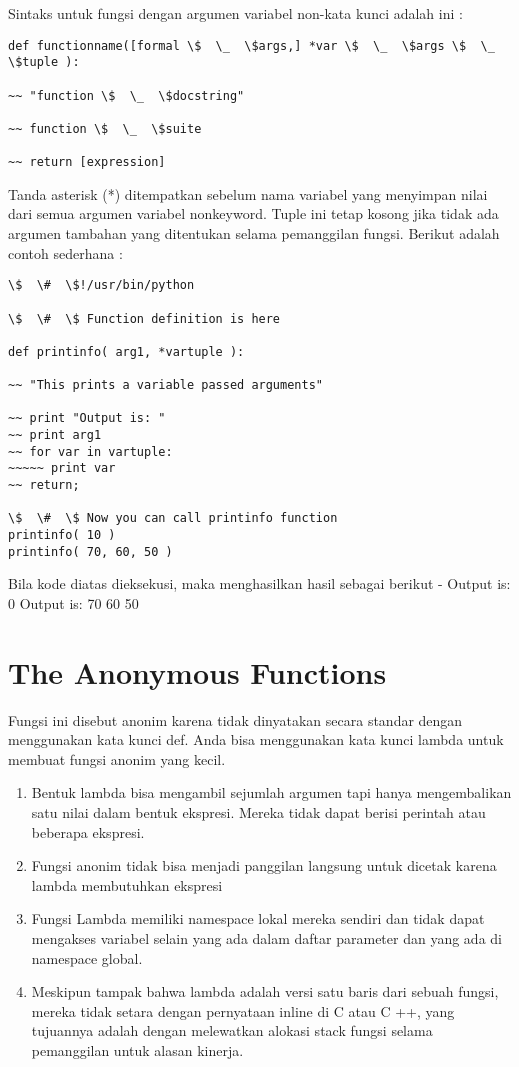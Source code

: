 Sintaks untuk fungsi dengan argumen variabel non-kata kunci adalah ini :
\begin{verbatim}
def functionname([formal \$  \_  \$args,] *var \$  \_  \$args \$  \_  \$tuple ): 

~~ "function \$  \_  \$docstring" 

~~ function \$  \_  \$suite 

~~ return [expression]
\end{verbatim}
Tanda asterisk (*) ditempatkan sebelum nama variabel yang menyimpan nilai dari semua argumen variabel nonkeyword. Tuple ini tetap kosong jika tidak ada argumen tambahan yang ditentukan selama pemanggilan fungsi. Berikut adalah contoh sederhana : 
\begin{verbatim}
\$  \#  \$!/usr/bin/python 

\$  \#  \$ Function definition is here 

def printinfo( arg1, *vartuple ): 

~~ "This prints a variable passed arguments" 

~~ print "Output is: " 
~~ print arg1
~~ for var in vartuple:
~~~~~ print var 
~~ return; 

\$  \#  \$ Now you can call printinfo function
printinfo( 10 ) 
printinfo( 70, 60, 50 ) 
\end{verbatim}
Bila kode diatas dieksekusi, maka menghasilkan hasil sebagai berikut - 
Output is: 
0
Output is: 
70 
60 
50 
\section{The Anonymous Functions} 
Fungsi ini disebut anonim karena tidak dinyatakan secara standar dengan menggunakan kata kunci def. Anda bisa menggunakan kata kunci lambda untuk membuat fungsi anonim yang kecil. 
\begin{enumerate}
\item Bentuk lambda bisa mengambil sejumlah argumen tapi hanya mengembalikan satu nilai dalam bentuk ekspresi. Mereka tidak dapat berisi perintah atau beberapa ekspresi. 
\item Fungsi anonim tidak bisa menjadi panggilan langsung untuk dicetak karena lambda membutuhkan ekspresi 
\item  Fungsi Lambda memiliki namespace lokal mereka sendiri dan tidak dapat mengakses variabel selain yang ada dalam daftar parameter dan yang ada di namespace global. 
\item Meskipun tampak bahwa lambda adalah versi satu baris dari sebuah fungsi, mereka tidak setara dengan pernyataan inline di C atau C ++, yang tujuannya adalah dengan melewatkan alokasi stack fungsi selama pemanggilan untuk alasan kinerja. 
\end{enumerate}

